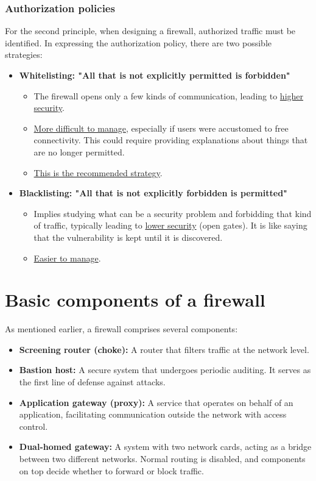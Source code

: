 \subsubsection{Authorization policies}
For the second principle, when designing a firewall, authorized traffic must be identified. In expressing the authorization policy, there are two possible strategies:
\begin{itemize}
	\item \textbf{Whitelisting: "All that is not explicitly permitted is forbidden"}
	      \begin{itemize}
		      \item The firewall opens only a few kinds of communication, leading to \underline{higher security}.
		      \item \underline{More difficult to manage}, especially if users were accustomed to free connectivity. This could require providing explanations about things that are no longer permitted.
		      \item \underline{This is the recommended strategy}.
	      \end{itemize}
	\item \textbf{Blacklisting: "All that is not explicitly forbidden is permitted"}
	      \begin{itemize}
		      \item Implies studying what can be a security problem and forbidding that kind of traffic, typically leading to \underline{lower security} (open gates). It is like saying that the vulnerability is kept until it is discovered.
		      \item \underline{Easier to manage}.
	      \end{itemize}
\end{itemize}



\section{Basic components of a firewall}
As mentioned earlier, a firewall comprises several components:
\begin{itemize}
	\item \textbf{Screening router (choke):} A router that filters traffic at the network level.
	\item \textbf{Bastion host:} A secure system that undergoes periodic auditing. It serves as the first line of defense against attacks.
	\item \textbf{Application gateway (proxy):} A service that operates on behalf of an application, facilitating communication outside the network with access control.
	\item \textbf{Dual-homed gateway:} A system with two network cards, acting as a bridge between two different networks. Normal routing is disabled, and components on top decide whether to forward or block traffic.
\end{itemize}

